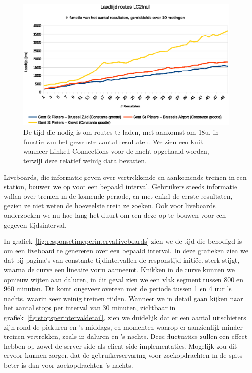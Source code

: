 \begin{figure}[h]
	\centering
	\includegraphics[width=1.00\textwidth]{images/Laadtijd_routes.eps}
	\caption[Laadtijd routes in functie van aantal resultaten]{De tijd die nodig is om routes te laden, met aankomst om 18u, in functie van het gewenste aantal resultaten. We zien een knik wanneer Linked Connections voor de nacht opgehaald worden, terwijl deze relatief weinig data bevatten.}
	\label{fig:responsetimeperresultsroute}
\end{figure}


Liveboards, die informatie geven over vertrekkende en aankomende treinen in een station, bouwen we op voor een bepaald interval. Gebruikers steeds informatie willen over treinen in de komende periode, en niet enkel de eerste resultaten, gezien ze niet weten de hoeveelste trein ze zoeken. Ook voor liveboards onderzoeken we nu hoe lang het duurt om een deze op te bouwen voor een gegeven tijdsinterval.

In grafiek~\ref{fig:responsetimeperintervalliveboards} zien we de tijd die benodigd is om een liveboard te genereren over een bepaald interval. In deze grafieken zien we dat bij pagina's van constante tijdintervallen de responstijd initiëel sterk stijgt, waarna de curve een lineaire vorm aanneemt. Knikken in de curve kunnen we opnieuw wijten aan daluren, in dit geval zien we een vlak segment tussen 800 en 960 minuten. Dit komt ongeveer overeen met de periode tussen 1 en 4 uur 's nachts, waarin zeer weinig treinen rijden. Wanneer we in detail gaan kijken naar het aantal stops per interval van 30 minuten, zichtbaar in grafiek~\ref{fig:stopsperintervaldetail}, zien we duidelijk dat er een aantal uitschieters zijn rond de piekuren en 's middags, en momenten waarop er aanzienlijk minder treinen vertrekken, zoals in daluren en 's nachts. Deze fluctuaties zullen een effect hebben op zowel de server-side als client-side implementaties. Mogelijk zou dit ervoor kunnen zorgen dat de gebruikerservaring voor zoekopdrachten in de spits beter is dan voor zoekopdrachten 's nachts.

